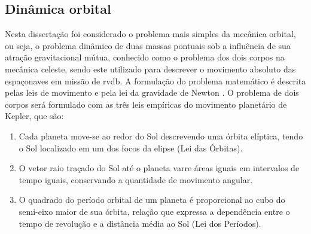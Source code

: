 \subsection{Dinâmica orbital}
\label{sec:dinamica_orbital}

Nesta dissertação foi considerado o problema mais simples da mecânica orbital, ou seja, o problema dinâmico de duas massas pontuais sob a influência de sua atração gravitacional mútua, conhecido como o problema dos dois corpos na mecânica celeste, sendo este utilizado para descrever o movimento absoluto das espaçonaves em missão de \gls{rvdb}.
A formulação do problema matemático é descrita pelas leis de movimento e pela lei da gravidade de Newton \cite{wie2008space}.
O problema de dois corpos será formulado com as três leis empíricas do movimento planetário de Kepler, que são:

\begin{enumerate}[label=(\roman*)]
    \item Cada planeta move-se ao redor do Sol descrevendo uma órbita elíptica, tendo o Sol localizado em um dos focos da elipse (Lei das Órbitas).
    \item O vetor raio traçado do Sol até o planeta varre áreas iguais em intervalos de tempo iguais, conservando a quantidade de movimento angular.
    \item O quadrado do período orbital de um planeta é proporcional ao cubo do semi-eixo maior de sua órbita, relação que expressa a dependência entre o tempo de revolução e a distância média ao Sol (Lei dos Períodos).
\end{enumerate}



